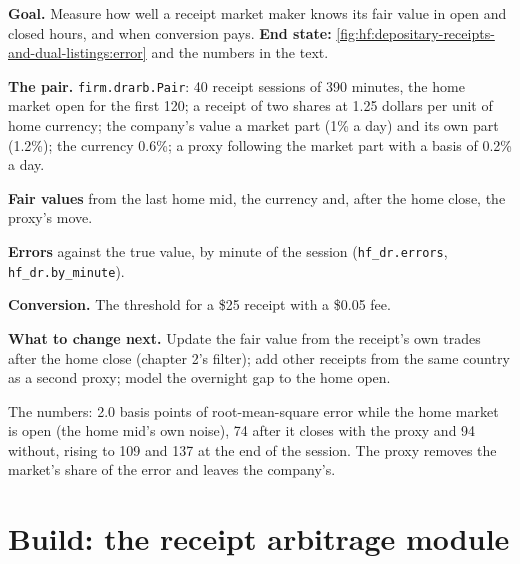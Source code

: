 \begin{tutorial}
\textbf{Goal.} Measure how well a receipt market maker knows its fair value in open and closed hours, and when conversion pays. \textbf{End state:}
\cref{fig:hf:depositary-receipts-and-dual-listings:error} and the numbers in the text.
\begin{tutsteps}
\item \textbf{The pair.} \texttt{firm.drarb.Pair}: 40 receipt sessions of 390 minutes, the home market open for the first 120; a receipt of two
shares at 1.25 dollars per unit of home currency; the company's value a market part (1\% a day) and its own part (1.2\%); the currency 0.6\%; a proxy
following the market part with a basis of 0.2\% a day.
\item \textbf{Fair values} from the last home mid, the currency and, after the home close, the proxy's move.
\label{lst:hf:depositary-receipts-and-dual-listings:quote}
\item \textbf{Errors} against the true value, by minute of the session (\texttt{hf\_dr.errors}, \texttt{hf\_dr.by\_minute}).
\item \textbf{Conversion.} The threshold for a \$25 receipt with a \$0.05 fee.
\label{lst:hf:depositary-receipts-and-dual-listings:conversion}
\end{tutsteps}
\textbf{What to change next.} Update the fair value from the receipt's own trades after the home close (chapter 2's filter); add other receipts
from the same country as a second proxy; model the overnight gap to the home open.
\end{tutorial}

The numbers: 2.0 basis points of root-mean-square error while the home market is open (the home mid's own noise), 74 after it closes with the proxy
and 94 without, rising to 109 and 137 at the end of the session. The proxy removes the market's share of the error and leaves the company's.

\section{Build: the receipt arbitrage module}\label{bld:hf:depositary-receipts-and-dual-listings:drarb}

